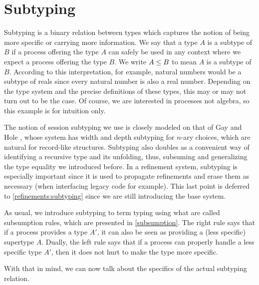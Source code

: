 
\chapter{Subtyping}
\label{base:subtyping}

Subtyping is a binary relation between types which captures the notion of being more specific or carrying more information. We say that a type $A$ is a subtype of $B$ if a process offering the type $A$ can safely be used in any context where we expect a process offering the type $B$. We write $A \le B$ to mean $A$ is a subtype of $B$. According to this interpretation, for example, natural numbers would be a subtype of reals since every natural number is also a real number. Depending on the type system and the precise definitions of these types, this may or may not turn out to be the case. Of course, we are interested in processes not algebra, so this example is for intuition only.

The notion of session subtyping we use is closely modeled on that of Gay and Hole \cite{GayH05}, whose system has width and depth subtyping for $n$-ary choices, which are natural for record-like structures. Subtyping also doubles as a convenient way of identifying a recursive type and its unfolding, thus, subsuming and generalizing the type equality we introduced before. In a refinement system, subtyping is especially important since it is used to propagate refinements and erase them as necessary (when interfacing legacy code for example). This last point is deferred to \cref{refinements:subtyping} since we are still introducing the base system.

As usual, we introduce subtyping to term typing using what are called subsumption rules, which are presented in \cref{subsumption}. The right rule says that if a process provides a type $A'$, it can also be seen as providing a (less specific) supertype $A$. Dually, the left rule says that if a process can properly handle a less specific type $A'$, then it does not hurt to make the type more specific. 


With that in mind, we can now talk about the specifics of the actual subtyping relation.


